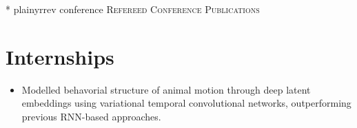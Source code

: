 \documentclass[11pt,a4paper,sans]{moderncv} %
\begin{document}
\nocite{conference}{*}
{plainyrrev}
{conference}
{\large \textsc{Refereed Conference Publications}}


\section{Internships}



{\begin{itemize}
    \item Modelled behavorial structure of animal motion through deep latent embeddings using variational temporal convolutional networks, outperforming previous RNN-based approaches.
\end{itemize}
}
\end{document}

